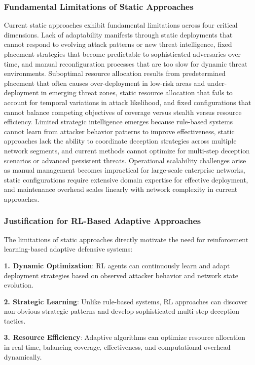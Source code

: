 \documentclass[12pt,oneside]{article}
\begin{document}
\subsubsection{Fundamental Limitations of Static Approaches}

Current static approaches exhibit fundamental limitations across four critical dimensions. Lack of adaptability manifests through static deployments that cannot respond to evolving attack patterns or new threat intelligence, fixed placement strategies that become predictable to sophisticated adversaries over time, and manual reconfiguration processes that are too slow for dynamic threat environments. Suboptimal resource allocation results from predetermined placement that often causes over-deployment in low-risk areas and under-deployment in emerging threat zones, static resource allocation that fails to account for temporal variations in attack likelihood, and fixed configurations that cannot balance competing objectives of coverage versus stealth versus resource efficiency. Limited strategic intelligence emerges because rule-based systems cannot learn from attacker behavior patterns to improve effectiveness, static approaches lack the ability to coordinate deception strategies across multiple network segments, and current methods cannot optimize for multi-step deception scenarios or advanced persistent threats. Operational scalability challenges arise as manual management becomes impractical for large-scale enterprise networks, static configurations require extensive domain expertise for effective deployment, and maintenance overhead scales linearly with network complexity in current approaches.

\subsubsection{Justification for RL-Based Adaptive Approaches}

The limitations of static approaches directly motivate the need for reinforcement learning-based adaptive defensive systems:

\textbf{1. Dynamic Optimization}: RL agents can continuously learn and adapt deployment strategies based on observed attacker behavior and network state evolution.

\textbf{2. Strategic Learning}: Unlike rule-based systems, RL approaches can discover non-obvious strategic patterns and develop sophisticated multi-step deception tactics.

\textbf{3. Resource Efficiency}: Adaptive algorithms can optimize resource allocation in real-time, balancing coverage, effectiveness, and computational overhead dynamically.
\end{document}
